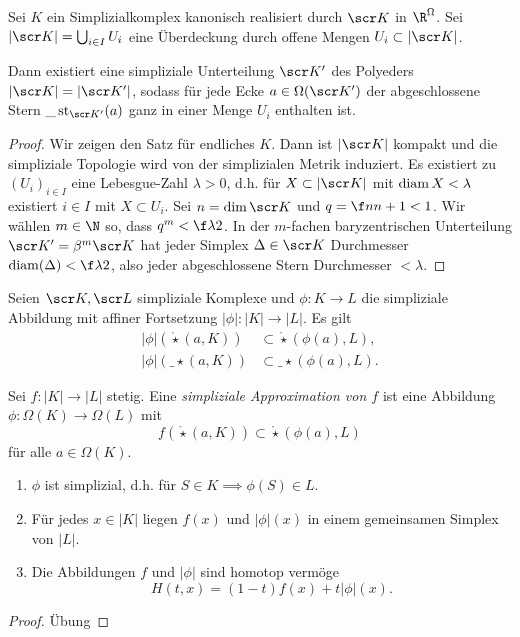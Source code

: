 \begin{st}
	Sei $K$ ein Simplizialkomplex kanonisch realisiert durch $\scr K$ in $\R^\Omega$.
	Sei $|\scr K| = \bigcup_{i\in I} U_i$ eine Überdeckung durch offene Mengen $U_i \subset |\scr K|$.

	Dann existiert eine simpliziale Unterteilung $\scr K'$ des Polyeders $|\scr K| = |\scr K'|$, sodass für jede Ecke $a \in \Omega(\scr K')$ der abgeschlossene Stern $\_\star_{\scr K'}(a)$ ganz in einer Menge $U_i$ enthalten ist.
	\begin{proof}
		Wir zeigen den Satz für endliches $K$.
		Dann ist $|\scr K|$ kompakt und die simpliziale Topologie wird von der simplizialen Metrik induziert.
		Es existiert zu $(U_i)_{i\in I}$ eine Lebesgue-Zahl $\lambda > 0$, d.h. für $X \subset |\scr K|$ mit $\operatorname{diam} X < \lambda$ existiert $i \in I$ mit $X \subset U_i$.
		Sei $n = \dim \scr K$ und $q = \f n{n+1} < 1$.
		Wir wählen $m \in \N$ so, dass $q^m < \f \lambda 2$.
		In der $m$-fachen baryzentrischen Unterteilung $\scr K' = \beta^m \scr K$ hat jeder Simplex $\Delta \in \scr K$ Durchmesser $\diam(\Delta) < \f \lambda 2$, also jeder abgeschlossene Stern Durchmesser $< \lambda$.
	\end{proof}
\end{st}

\begin{nt}
	Seien $\scr K, \scr L$ simpliziale Komplexe und $\phi: K \to L$ die simpliziale Abbildung mit affiner Fortsetzung $|\phi|: |K| \to |L|$.
	Es gilt
	\begin{align*}
		|\phi|(\mathring \star(a, K)) &\subset \mathring \star (\phi(a), L), \\
		|\phi|(\_\star(a,K)) &\subset \_\star(\phi(a), L).
	\end{align*}
\end{nt}

\begin{df}
	Sei $f: |K| \to |L|$ stetig.
	Eine \emph{simpliziale Approximation von $f$} ist eine Abbildung $\phi: \Omega(K) \to \Omega(L)$ mit
	\[
		f(\mathring \star(a, K)) \subset \mathring\star(\phi(a), L)
	\]
	für alle $a \in \Omega(K)$.
\end{df}

\begin{lem}
	\begin{enumerate}[(1)]
		\item
			$\phi$ ist simplizial, d.h. für $S \in K \implies \phi(S) \in L$.
		\item
			Für jedes $x \in |K|$ liegen $f(x)$ und $|\phi|(x)$ in einem gemeinsamen Simplex von $|L|$.
		\item
			Die Abbildungen $f$ und $|\phi|$ sind homotop vermöge
			\[
				H(t, x) = (1 - t) f(x) + t |\phi|(x).
			\]
	\end{enumerate}
	\begin{proof}
		Übung
	\end{proof}
\end{lem}

